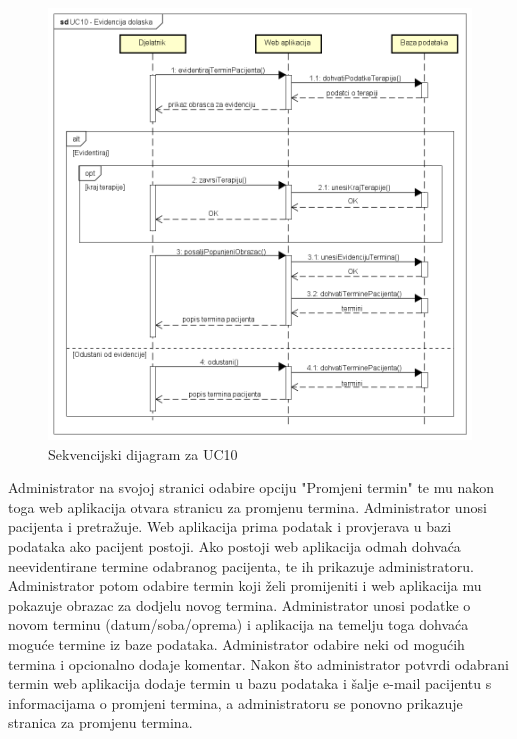 				\begin{figure}[H]
					\includegraphics[scale=0.4]{slike/UC10_Evidencija_dolaska.PNG} %
					\centering
					\caption{Sekvencijski dijagram za UC10}
					\label{fig:sekvencijski_dijagram_2}
				\end{figure}
				
				
				\textbf{}
				
				Administrator na svojoj stranici odabire opciju "Promjeni termin" te mu nakon toga web aplikacija otvara stranicu za promjenu termina. Administrator unosi pacijenta i pretražuje. Web aplikacija prima podatak i provjerava u bazi podataka ako pacijent postoji. Ako postoji web aplikacija odmah dohvaća neevidentirane termine odabranog pacijenta, te ih prikazuje administratoru. Administrator potom odabire termin koji želi promijeniti i web aplikacija mu pokazuje obrazac za dodjelu novog termina. Administrator unosi podatke o novom terminu (datum/soba/oprema) i aplikacija na temelju toga dohvaća moguće termine iz baze podataka. Administrator odabire neki od mogućih termina i opcionalno dodaje komentar. Nakon što administrator potvrdi odabrani termin web aplikacija dodaje termin u bazu podataka i šalje e-mail pacijentu s informacijama o promjeni termina, a administratoru se ponovno prikazuje stranica za promjenu termina. 
				

